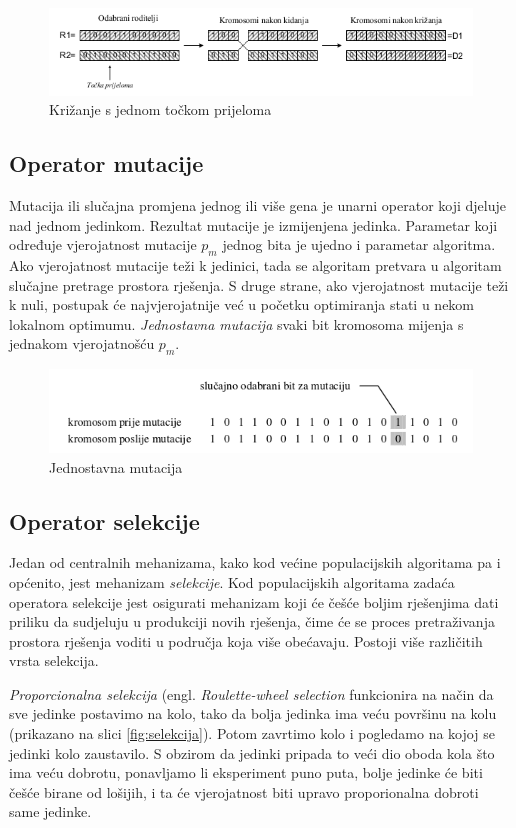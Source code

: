 \documentclass[times, utf8, zavrsni]{fer}
\begin{document}
\begin{figure}[htb]
\centering
\includegraphics[width=12cm]{img/krizanje.png}
\caption{Križanje s jednom točkom prijeloma}
\label{fig:krizanje}
\end{figure}

\subsection{Operator mutacije}
Mutacija ili slučajna promjena jednog ili više gena je unarni operator koji djeluje nad jednom jedinkom. Rezultat mutacije je izmijenjena jedinka. Parametar koji određuje vjerojatnost mutacije $p_m$ jednog bita je ujedno i parametar algoritma. Ako vjerojatnost mutacije teži k jedinici, tada se algoritam pretvara u algoritam slučajne pretrage prostora rješenja. S druge strane, ako vjerojatnost mutacije teži k nuli, postupak će najvjerojatnije već u početku optimiranja stati u nekom lokalnom optimumu. \emph{Jednostavna mutacija} svaki bit kromosoma mijenja s jednakom vjerojatnošću $p_m$.

\begin{figure}[htb]
\centering
\includegraphics[width=12cm]{img/mutacija.png}
\caption{Jednostavna mutacija}
\label{fig:mutacija}
\end{figure}

\subsection{Operator selekcije}
Jedan od centralnih mehanizama, kako kod većine populacijskih algoritama pa i općenito, jest mehanizam \emph{selekcije}. Kod populacijskih algoritama zadaća operatora selekcije jest osigurati mehanizam koji će češće boljim rješenjima dati priliku da sudjeluju u produkciji novih rješenja, čime će se proces pretraživanja prostora rješenja voditi u područja koja više obećavaju. Postoji više različitih vrsta selekcija.

\emph{Proporcionalna selekcija} (engl. \emph{Roulette-wheel selection} funkcionira na način da sve jedinke postavimo na kolo, tako da bolja jedinka ima veću površinu na kolu (prikazano na slici \ref{fig:selekcija}). Potom zavrtimo kolo i pogledamo na kojoj se jedinki kolo zaustavilo. S obzirom da jedinki pripada to veći dio oboda kola što ima veću dobrotu, ponavljamo li eksperiment puno puta, bolje jedinke će biti češće birane od lošijih, i ta će vjerojatnost biti upravo proporionalna dobroti same jedinke.
\end{document}
